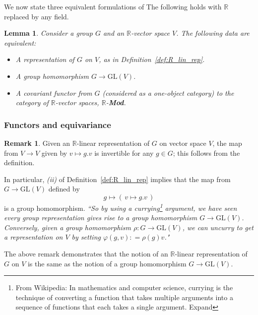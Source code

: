 \documentclass[12pt]{article}
\numberwithin{equation}{section}
\newtheorem{lem}[thm]{Lemma}
\theoremstyle{definition}
\newtheorem{rmk}[thm]{Remark}
\newcommand{		\GL		}	{	\textrm{GL}				}
\newcommand{		\B		}	{\textbf					} %
\newcommand{		\1		}	{	\bm{1}					}%
\begin{document}
We now state three equivalent formulations of The following holds with $\mathbb{R}$ replaced by any field.

\begin{lem} Consider a group $G$ and an $\mathbb{R}$-vector space $V$. The following data are equivalent:
\begin{itemize}
\item A representation of $G$ on $V$, as in Definition~\ref{def:R_lin_rep}. 
\item A group homomorphism $G \to \GL(V)$.
\item A covariant functor from $G$ (considered as a one-object category) to the category of $\mathbb{R}$-vector spaces, $\mathbb{R}$-{\rm \B{Mod}}. 
\end{itemize}
\end{lem}

\subsubsection*{Functors and equivariance}


\begin{rmk} 
\label{rmk:curry}
Given an $\mathbb{R}$-linear representation of $G$ on vector space $V$, the map from $V \to V$ given by $v \mapsto g.v$ is invertible for any $g \in G$; this follows from the definition. 

In particular, \emph{(ii)} of Definition~\ref{def:R_lin_rep} implies that the map from $G \to \GL(V)$ defined by
$$
g \mapsto \left(\, v \mapsto g.v \, \right)
$$
is a group homomorphism. \emph{``So by using a currying\footnote{From Wikipedia: In mathematics and computer science, currying is the technique of converting a function that takes multiple arguments into a sequence of functions that each takes a single argument. Expand} argument, we have seen every group representation gives rise to a group homomorphism $G \to \GL(V)$. Conversely, given a group homomorphism $\rho : G \to \GL(V)$, we can uncurry to get a representation on $V$ by setting $\varphi(g,v) : = \rho(g) v$."}
\end{rmk}

The above remark demonstrates that the notion of an $\mathbb{R}$-linear representation of $G$ on $V$ is the same as the notion of a group homomorphism $G \to \GL(V)$. 




%
%
%
%
%
%
\newpage
\end{document}
